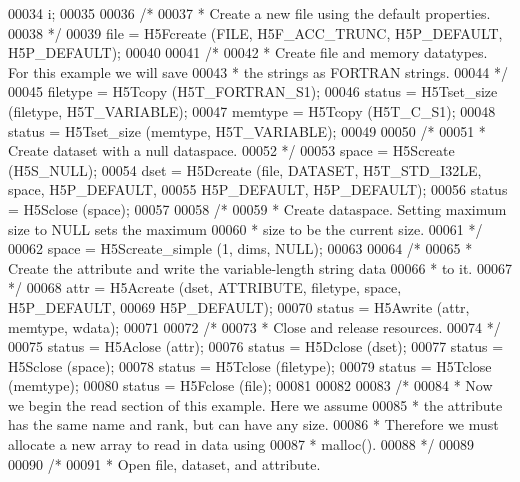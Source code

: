 \begin{DoxyCode}
00034                 i;
00035 
00036     \textcolor{comment}{/*}
00037 \textcolor{comment}{     * Create a new file using the default properties.}
00038 \textcolor{comment}{     */}
00039     file = H5Fcreate (FILE, H5F\_ACC\_TRUNC, H5P\_DEFAULT, H5P\_DEFAULT);
00040 
00041     \textcolor{comment}{/*}
00042 \textcolor{comment}{     * Create file and memory datatypes.  For this example we will save}
00043 \textcolor{comment}{     * the strings as FORTRAN strings.}
00044 \textcolor{comment}{     */}
00045     filetype = H5Tcopy (H5T\_FORTRAN\_S1);
00046     status = H5Tset\_size (filetype, H5T\_VARIABLE);
00047     memtype = H5Tcopy (H5T\_C\_S1);
00048     status = H5Tset\_size (memtype, H5T\_VARIABLE);
00049 
00050     \textcolor{comment}{/*}
00051 \textcolor{comment}{     * Create dataset with a null dataspace.}
00052 \textcolor{comment}{     */}
00053     space = H5Screate (H5S\_NULL);
00054     dset = H5Dcreate (file, DATASET, H5T\_STD\_I32LE, space, H5P\_DEFAULT,
00055                 H5P\_DEFAULT, H5P\_DEFAULT);
00056     status = H5Sclose (space);
00057 
00058     \textcolor{comment}{/*}
00059 \textcolor{comment}{     * Create dataspace.  Setting maximum size to NULL sets the maximum}
00060 \textcolor{comment}{     * size to be the current size.}
00061 \textcolor{comment}{     */}
00062     space = H5Screate\_simple (1, dims, NULL);
00063 
00064     \textcolor{comment}{/*}
00065 \textcolor{comment}{     * Create the attribute and write the variable-length string data}
00066 \textcolor{comment}{     * to it.}
00067 \textcolor{comment}{     */}
00068     attr = H5Acreate (dset, ATTRIBUTE, filetype, space, H5P\_DEFAULT,
00069                 H5P\_DEFAULT);
00070     status = H5Awrite (attr, memtype, wdata);
00071 
00072     \textcolor{comment}{/*}
00073 \textcolor{comment}{     * Close and release resources.}
00074 \textcolor{comment}{     */}
00075     status = H5Aclose (attr);
00076     status = H5Dclose (dset);
00077     status = H5Sclose (space);
00078     status = H5Tclose (filetype);
00079     status = H5Tclose (memtype);
00080     status = H5Fclose (file);
00081 
00082 
00083     \textcolor{comment}{/*}
00084 \textcolor{comment}{     * Now we begin the read section of this example.  Here we assume}
00085 \textcolor{comment}{     * the attribute has the same name and rank, but can have any size.}
00086 \textcolor{comment}{     * Therefore we must allocate a new array to read in data using}
00087 \textcolor{comment}{     * malloc().}
00088 \textcolor{comment}{     */}
00089 
00090     \textcolor{comment}{/*}
00091 \textcolor{comment}{     * Open file, dataset, and attribute.}

\end{DoxyCode}
